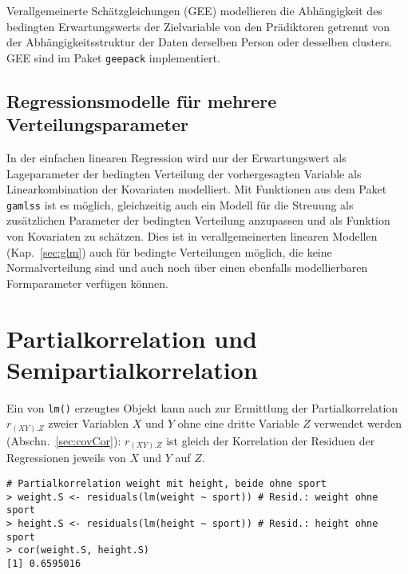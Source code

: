 Verallgemeinerte Schätzgleichungen (GEE) modellieren die Abhängigkeit des bedingten Erwartungswerts der Zielvariable von den Prädiktoren getrennt von der Abhängigkeitsstruktur der Daten derselben Person oder desselben clusters. GEE sind im Paket \lstinline!geepack! \cite{Hojsgaard2006,Yan2004} implementiert.

\subsection{Regressionsmodelle für mehrere Verteilungsparameter}
\label{sec:gamlss}

In der einfachen linearen Regression wird nur der Erwartungswert als Lageparameter der bedingten Verteilung der vorhergesagten Variable als Linearkombination der Kovariaten modelliert. Mit Funktionen aus dem Paket \lstinline!gamlss! \cite{Stasinopoulos2017} ist es möglich, gleichzeitig auch ein Modell für die Streuung als zusätzlichen Parameter der bedingten Verteilung anzupassen und als Funktion von Kovariaten zu schätzen. Dies ist in verallgemeinerten linearen Modellen (Kap.\ \ref{sec:glm}) auch für bedingte Verteilungen möglich, die keine Normalverteilung sind und auch noch über einen ebenfalls modellierbaren Formparameter verfügen können.

\section{Partialkorrelation und Semipartialkorrelation}
\label{sec:partCorReg}

Ein von \lstinline!lm()! erzeugtes Objekt kann auch zur Ermittlung der Partialkorrelation $r_{(XY).Z}$ zweier Variablen $X$ und $Y$ ohne eine dritte Variable $Z$ verwendet werden (Abschn.\ \ref{sec:covCor}): $r_{(XY).Z}$ ist gleich der Korrelation der Residuen der Regressionen jeweils von $X$ und $Y$ auf $Z$.
\begin{lstlisting}
# Partialkorrelation weight mit height, beide ohne sport
> weight.S <- residuals(lm(weight ~ sport)) # Resid.: weight ohne sport
> height.S <- residuals(lm(height ~ sport)) # Resid.: height ohne sport
> cor(weight.S, height.S)
[1] 0.6595016
\end{lstlisting}

